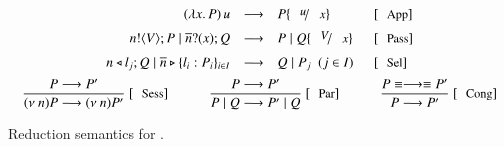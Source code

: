 \begin{figure}[t!]
\[
\begin{array}{c}
	\begin{array}{rcll}
		(\abs{x}{P}) \, u  & \red & P \subst{u}{x} & \orule{App}
		\\[2mm]
		\bout{n}{V} P \Par \binp{\dual{n}}{x} Q & \red & P \Par Q \subst{V}{x} & \orule{Pass}
		\\[2mm]
		\bsel{n}{l_j} Q \Par \bbra{\dual{n}}{l_i : P_i}_{i \in I} & \red & Q \Par P_j ~~(j \in I)~~  & \orule{Sel}
	\end{array}
	\\[8mm]
	\begin{array}{c}
		\tree{
			P \red P'
		}{
			\news{n} P \red \news{n} P'
		}\ \orule{Sess}
		\quad \qquad
		\tree{
			P \red P'
		}{
			P \Par Q \red  P' \Par Q
		}\ \orule{Par}
		\quad \qquad
		\tree{
			P \scong \red \scong P'
		}{
			P \red P'
		}\ \orule{Cong}
	\end{array}
\end{array}
\]
	\caption{Reduction semantics for \HOp. \label{fig:reduction}}
\end{figure}
